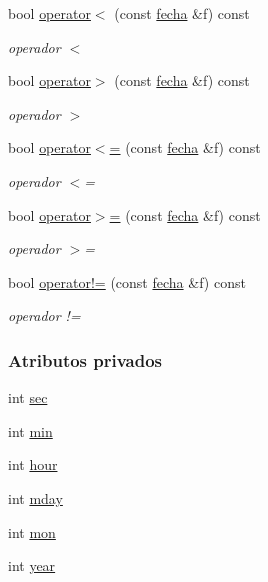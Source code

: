 \begin{DoxyCompactItemize}
bool \hyperlink{classfecha_a27803300b9698e1a40ef48f2009948c5}{operator$<$} (const \hyperlink{classfecha}{fecha} \&f) const 
\begin{DoxyCompactList}\small\item\em operador $<$ \end{DoxyCompactList}\item 
bool \hyperlink{classfecha_aaded7646e80d88492b31b17b4fb001fd}{operator$>$} (const \hyperlink{classfecha}{fecha} \&f) const 
\begin{DoxyCompactList}\small\item\em operador $>$ \end{DoxyCompactList}\item 
bool \hyperlink{classfecha_a8dfb2f2a7424bdb1dacc6df122b0a0c8}{operator$<$=} (const \hyperlink{classfecha}{fecha} \&f) const 
\begin{DoxyCompactList}\small\item\em operador $<$= \end{DoxyCompactList}\item 
bool \hyperlink{classfecha_a98d0f3009cb7205b5ddb3b81596d9cc7}{operator$>$=} (const \hyperlink{classfecha}{fecha} \&f) const 
\begin{DoxyCompactList}\small\item\em operador $>$= \end{DoxyCompactList}\item 
bool \hyperlink{classfecha_a1f6d28759c45b138efb80d25a7c398b8}{operator!=} (const \hyperlink{classfecha}{fecha} \&f) const 
\begin{DoxyCompactList}\small\item\em operador != \end{DoxyCompactList}\end{DoxyCompactItemize}
\subsubsection*{Atributos privados}
\begin{DoxyCompactItemize}
\item 
int \hyperlink{classfecha_a09eb9f4865c9ff896f438b8df3cf6485}{sec}
\item 
int \hyperlink{classfecha_a3875f28ff6e7c383923c80e86afaec2e}{min}
\item 
int \hyperlink{classfecha_a895a2cc9dd11326a8392a4c6fc928a14}{hour}
\item 
int \hyperlink{classfecha_a9c1dc50e5f5efcd3e30a981bfd495b1d}{mday}
\item 
int \hyperlink{classfecha_a5c86be74f1215600f99798d54126ba16}{mon}
\item 
int \hyperlink{classfecha_a4d06534f05a6350ae229ce2b17b860e8}{year}
\end{DoxyCompactItemize}
